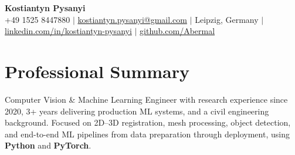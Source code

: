 \documentclass[letterpaper,10pt]{article}
\begin{document}
\begin{center}
  \textbf{\Huge Kostiantyn Pysanyi}\vspace{4pt} \\
  \small +49 1525 8447880 $|$ \href{mailto:kostiantyn.pysanyi@gmail.com}{kostiantyn.pysanyi@gmail.com} $|$ Leipzig, Germany $|$
  \href{https://www.linkedin.com/in/kostiantyn-pysanyi/}{linkedin.com/in/kostiantyn-pysanyi} $|$ \href{https://github.com/Abermal}{github.com/Abermal}
\end{center}
\addtolength{\topmargin}{-0.12in}
\enlargethispage{0.35in}
\vspace{-8pt}

\titlespacing*{\section}{0pt}{4pt}{4pt}



\section{Professional Summary}
Computer Vision \& Machine Learning Engineer with research experience since 2020, 3+ years delivering production ML systems, and a civil engineering background. Focused on 2D--3D registration, mesh processing, object detection, and end-to-end ML pipelines from data preparation through deployment, using \textbf{Python} and \textbf{PyTorch}.
\end{document}
